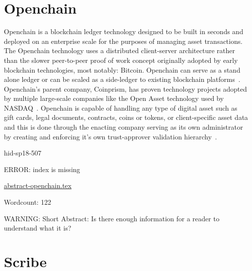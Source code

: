 \section{Openchain}

Openchain is a blockchain ledger technology designed to be built in
seconds and deployed on an enterprise scale for the purposes of
managing asset transactions. The Openchain technology uses a
distributed client-server architecture rather than the slower
peer-to-peer proof of work concept originally adopted by early
blockchain technologies, most notably: Bitcoin. Openchain can serve as
a stand alone ledger or can be scaled as a side-ledger to existing
blockchain platforms~\cite{hid-sp18-507-Openchain}. Openchain's parent
company, Coinprism, has proven technology projects adopted by multiple
large-scale companies like the Open Asset technology used by
NASDAQ~\cite{hid-sp18-507-BitcoinNews}. Openchain is capable of
handling any type of digital asset such as gift cards, legal
documents, contracts, coins or tokens, or client-specific asset data
and this is done through the enacting company serving as its own
administrator by creating and enforcing it's own trust-approver
validation hierarchy~\cite{hid-sp18-507-Coindesk}.


\begin{IU}

hid-sp18-507

ERROR: index is missing

\href{https://github.com/cloudmesh-community/hid-sp18-507/blob/master//technology/abstract-openchain.tex}{abstract-openchain.tex}

 

Wordcount: 122

WARNING: Short Abstract: Is there enough information for a reader to understand what it is?

\end{IU}

\section{Scribe}

